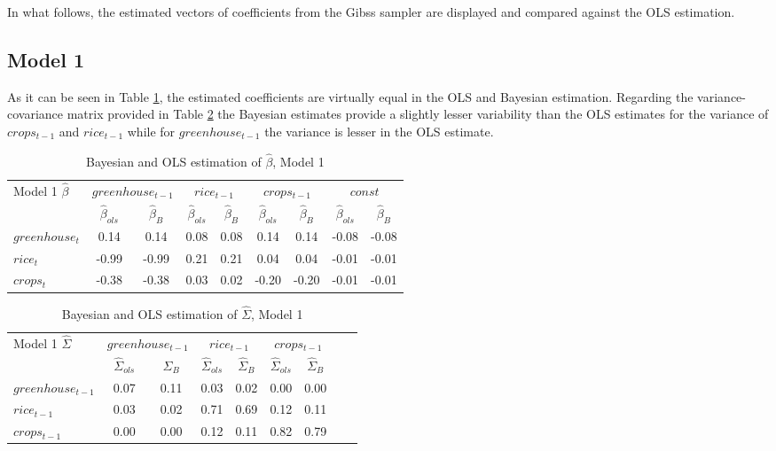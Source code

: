 \documentclass[12pt]{article}
\begin{document}
In what follows, the estimated vectors of coefficients from the Gibss sampler are displayed and compared against the OLS estimation. 

\subsection*{Model 1} \label{Results_model1}

As it can be seen in Table \ref{tab:tab_beta_1}, the estimated coefficients are virtually equal in the OLS and Bayesian estimation. Regarding the variance-covariance matrix provided in Table \ref{tab:tab_sigma_1} the Bayesian estimates provide a slightly lesser variability than the OLS estimates for the variance of $crops_{t-1}$ and $rice_{t-1}$ while for $greenhouse_{t-1}$ the variance is lesser in the OLS estimate.\\

\begin{table}[H]
\centering
\begin{tabular}{|l|c|c|c|c|c|c|c|c|}
  \hline
 \multirow{2}{*}{Model 1 $\hat{\beta}$} & \multicolumn{2}{c|}{$greenhouse_{t-1}$} & \multicolumn{2}{c|}{$rice_{t-1}$}  & \multicolumn{2}{c|}{$crops_{t-1}$} & \multicolumn{2}{c|}{$const$} \\  \cline{2-9}
 & $\hat{\beta}_{ols}$ & $\hat{\beta}_{B}$ & $\hat{\beta}_{ols}$ & $\hat{\beta}_{B}$ & $\hat{\beta}_{ols}$ & $\hat{\beta}_{B}$ & $\hat{\beta}_{ols}$ & $\hat{\beta}_{B}$\\
  \hline
    $greenhouse_{t}$ & 0.14 & 0.14 & 0.08 & 0.08 & 0.14  &  0.14 &  -0.08  & -0.08  \\ 
    $rice_{t}$ & -0.99 & -0.99 & 0.21 &  0.21 & 0.04 & 0.04 &-0.01 & -0.01\\ 
    $crops_{t}$ & -0.38 & -0.38 & 0.03 & 0.02 & -0.20 & -0.20 & -0.01 & -0.01 \\ 
   \hline
\end{tabular}
\caption{Bayesian and OLS estimation of $\hat{\beta}$, Model 1} \label{tab:tab_beta_1}
\end{table}

\begin{table}[H]
\centering
\begin{tabular}{|l|c|c|c|c|c|c|c|c|}
  \hline
 \multirow{2}{*}{Model 1 $\hat{\Sigma}$}& \multicolumn{2}{c|}{$greenhouse_{t-1}$} & \multicolumn{2}{c|}{$rice_{t-1}$}  & \multicolumn{2}{c|}{$crops_{t-1}$} \\  \cline{2-7}
 & $\hat{\Sigma}_{ols}$ & $\hat{\Sigma}_{B}$ & $\hat{\Sigma}_{ols}$ & $\hat{\Sigma}_{B}$ & $\hat{\Sigma}_{ols}$ & $\hat{\Sigma}_{B}$ \\
  \hline
    $greenhouse_{t-1}$ & 0.07 & 0.11 & 0.03 & 0.02 & 0.00  &  0.00   \\ 
    $rice_{t-1}$ & 0.03 & 0.02 & 0.71 &  0.69 & 0.12 & 0.11 \\ 
    $crops_{t-1}$ & 0.00 & 0.00 & 0.12 & 0.11 & 0.82 & 0.79 \\ 
   \hline
\end{tabular}
\caption{Bayesian and OLS estimation of $\hat{\Sigma}$, Model 1} \label{tab:tab_sigma_1}
\end{table}
\end{document}
